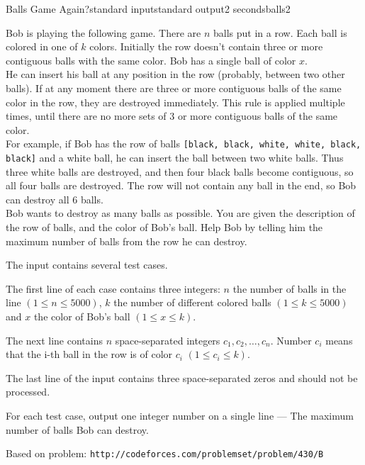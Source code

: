 \begin{problem}{Balls Game Again?}{standard input}{standard output}{2 seconds}{balls2}

Bob is playing the following game. There are $n$ balls put in a row. Each ball is colored in one of $k$ colors. Initially the row doesn't contain three or more contiguous balls with the same color. Bob has a single ball of color $x$.\\
He can insert his ball at any position in the row (probably, between two other balls). If at any moment there are three or more contiguous balls of the same color in the row, they are destroyed immediately. This rule is applied multiple times, until there are no more sets of 3 or more contiguous balls of the same color.\\
For example, if Bob has the row of balls \verb|[black, black, white, white, black, black]| and a white ball, he can insert the ball between two white balls. Thus three white balls are destroyed, and then four black balls become contiguous, so all four balls are destroyed. The row will not contain any ball in the end, so Bob can destroy all 6 balls.\\
Bob wants to destroy as many balls as possible. You are given the description of the row of balls, and the color of Bob's ball. Help Bob by telling him the maximum number of balls from the row he can destroy.

\InputFile

The input contains several test cases.

The first line of each case contains three integers: $n$ the number of balls in the line $ (1 \leq n \leq 5000)$, $k$ the number of different colored balls $(1 \leq k \leq 5000)$ and $x$ the color of Bob's ball $(1 \leq x \leq k)$.

The next line contains $n$ space-separated integers $c_1, c_2, \ldots, c_n$. Number $c_i$ means that the i-th ball in the row is of color $c_i$ $(1 \leq c_i \leq k)$.

The last line of the input contains three space-separated zeros and should not be processed.

\OutputFile

For each test case, output one integer number on a single line --- The maximum number of balls Bob can destroy.
\Example

\begin{example}
%
\end{example}

Based on problem: \verb|http://codeforces.com/problemset/problem/430/B|

\end{problem}
